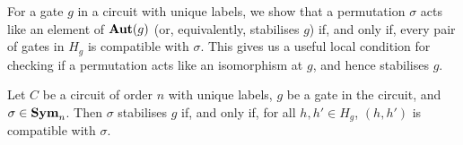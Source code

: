 \documentclass[../paper.tex]{subfiles}
\begin{document}

For a gate $g$ in a circuit with unique labels, we show that a permutation
$\sigma$ acts like an element of $\text{\textbf{Aut}}(g)$ (or, equivalently, stabilises $g$)
if, and only if, every pair of gates in $H_g$ is compatible with $\sigma$. This
gives us a useful local condition for checking if a permutation acts like an
isomorphism at $g$, and hence stabilises $g$.

\begin{lem}
  Let $C$ be a circuit of order $n$ with unique labels, $g$ be a gate in the
  circuit, and $\sigma \in \text{\textbf{Sym}}_n$. Then $\sigma$ stabilises $g$ if, and only
  if, for all $h, h' \in H_g$, $(h, h')$ is compatible with $\sigma$.
  \label{lem:isostab-compatible}
\end{lem}
\end{document}
